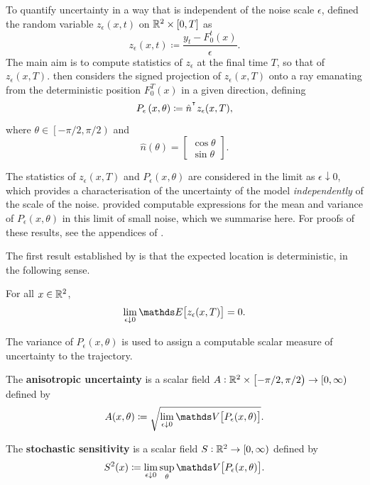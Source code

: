 To quantify uncertainty in a way that is independent of the noise scale \(\epsilon\), \citet{Balasuriya_2020_StochasticSensitivityComputable} defined the random variable \(z_\epsilon\left(x,t\right)\) on \(\mathbb{R}^2 \times [0,T]\) as
\[
	z_\epsilon\left(x,t\right) \coloneqq \frac{y_t - F_0^t(x)}{\epsilon}.
\]
The main aim is to compute statistics of \(z_\epsilon\) at the final time \(T\), so that of \(z_\epsilon\left(x,T\right)\).
\citet{Balasuriya_2020_StochasticSensitivityComputable} then considers the signed projection of \(z_\epsilon\left(x,T\right)\) onto a ray emanating from the deterministic position \(F_0^T(x)\) in a given direction, defining
\[
	P_\epsilon\left(x,\theta\right) \coloneqq \hat{n}^{^{\intercal}} z_\epsilon(x,T),
\]
where \(\theta \in \left[-\pi/2, \pi/2\right)\) and
\[
	\hat{n}(\theta) = \begin{bmatrix}
		\cos{\theta} \\
		\sin{\theta}
	\end{bmatrix}.
\]


The statistics of \(z_\epsilon\left(x,T\right)\) and \(P_\epsilon(x,\theta)\) are considered in the limit as \(\epsilon\downarrow 0\), which provides a characterisation of the uncertainty of the model \emph{independently} of the scale of the noise.
\citet{Balasuriya_2020_StochasticSensitivityComputable} provided computable expressions for the mean and variance of \(P_\epsilon\left(x,\theta\right)\) in this limit of small noise, which we summarise here.
For proofs of these results, see the appendices of \citet{Balasuriya_2020_StochasticSensitivityComputable}.

The first result established by \citet{Balasuriya_2020_StochasticSensitivityComputable} is that the expected location is deterministic, in the following sense.
\begin{theorem}
	For all \(x \in \mathbb{R}^2\),
	\[
		\lim_{\epsilon\downarrow 0}\avg{z_\epsilon(x,T)} = 0.
	\]
\end{theorem}

The variance of \(P_\epsilon\left(x,\theta\right)\) is used to assign a computable scalar measure of uncertainty to the trajectory.

\begin{definition}
	\begin{alpharate}
		\item The \textbf{anisotropic uncertainty} is a scalar field \(A: \mathbb{R}^2\times\left[-\pi/2, \pi/2\right) \to [0,\infty)\) defined by
		\[
			A(x,\theta) \coloneqq \sqrt{\lim_{\epsilon\downarrow 0}\var{P_\epsilon(x,\theta)}}.
		\]

		\item The \textbf{stochastic sensitivity} is a scalar field \(S: \mathbb{R}^2 \to [0,\infty)\) defined by
		\[
			S^2(x) \coloneqq \lim_{\epsilon\downarrow 0}\sup_{\theta}{\var{P_\epsilon(x,\theta)}}.
		\]
	\end{alpharate}
\end{definition}


